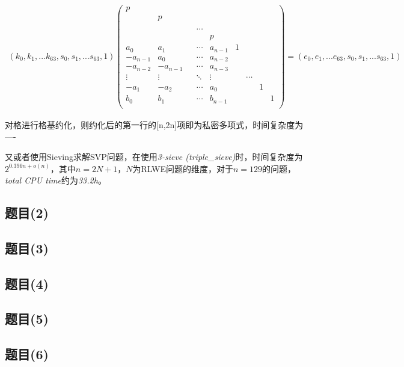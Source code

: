 \documentclass[12pt,a4paper]{article}
\numberwithin{equation}{section}
\begin{document}
\begin{align}
	(k_0,k_1,...k_{63},s_0,s_1,...s_{63},1)
	\left(
	\begin{smallmatrix}
			p\\
			&p\\
			&&\\
			&&&\cdots\\
			&&&&p\\
			a_0    &a_1    &   &\cdots &a_{n-1}            &1\\
			-a_{n-1}&a_0    &   &\cdots &a_{n-2}       &&\\
			-a_{n-2}&-a_{n-1}&   &\cdots &a_{n-3}  &&\\
			\vdots &\vdots &&\ddots &\vdots             &&\cdots\\
			-a_1    &-a_2    &   &\cdots &a_0 &&&1\\
			b_0    &b_1    &   &\cdots &b_{n-1}&&&&1\\
		\end{smallmatrix}
	\right)
	=
	(e_0,e_1,...e_{63},s_0,s_1,...s_{63},1)
\end{align}

对格进行格基约化，则约化后的第一行的[n,2n]项即为私密多项式，时间复杂度为----

又或者使用Sieving求解SVP问题，在使用\textit{3-sieve (triple\_sieve)}时，时间复杂度为$2^{0.396n+o(n)}$，其中$n=2N+1$，$N$为RLWE问题的维度，对于$n=129$的问题，\textit{total CPU time}约为\textit{33.2h}。

\subsection{题目(2)}

\subsection{题目(3)}

\subsection{题目(4)}

\subsection{题目(5)}

\subsection{题目(6)}
\end{document}
